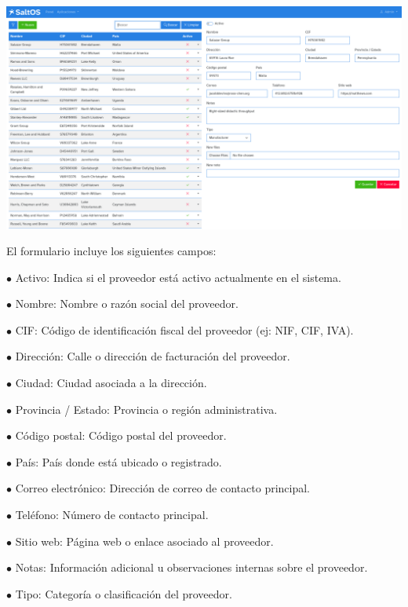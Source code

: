 \documentclass[a4paper]{article}
\begin{document}
\begin{center}\includegraphics[width=1\textwidth]{../ujest/snaps/test-screenshots-js-screenshots-purchases-suppliers-edit-100-es-es-1-snap.png}\end{center}

El formulario incluye los siguientes campos:

\begin{compactitem}
\item[\color{myblue}$\bullet$] Activo: Indica si el proveedor está activo actualmente en el sistema.
\item[\color{myblue}$\bullet$] Nombre: Nombre o razón social del proveedor.
\item[\color{myblue}$\bullet$] CIF: Código de identificación fiscal del proveedor (ej: NIF, CIF, IVA).
\item[\color{myblue}$\bullet$] Dirección: Calle o dirección de facturación del proveedor.
\item[\color{myblue}$\bullet$] Ciudad: Ciudad asociada a la dirección.
\item[\color{myblue}$\bullet$] Provincia / Estado: Provincia o región administrativa.
\item[\color{myblue}$\bullet$] Código postal: Código postal del proveedor.
\item[\color{myblue}$\bullet$] País: País donde está ubicado o registrado.
\item[\color{myblue}$\bullet$] Correo electrónico: Dirección de correo de contacto principal.
\item[\color{myblue}$\bullet$] Teléfono: Número de contacto principal.
\item[\color{myblue}$\bullet$] Sitio web: Página web o enlace asociado al proveedor.
\item[\color{myblue}$\bullet$] Notas: Información adicional u observaciones internas sobre el proveedor.
\item[\color{myblue}$\bullet$] Tipo: Categoría o clasificación del proveedor.
\end{compactitem}
\end{document}
